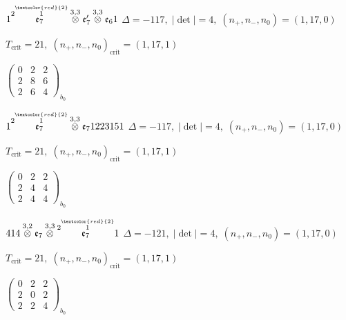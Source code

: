 \documentclass[10pt]{article}
\begin{document}
\smallskip

$1\overset{2\overset{\textcolor{red}{2}}{1}}{\mathfrak{e}_7}\overset{3,3}{\otimes}\mathfrak{e}_7'\overset{3,3}{\otimes}\mathfrak{e}_61$ \quad $\Delta=-117,\; |\det|=4,\; (n_+,n_-,n_0)=(1,17,0)$

\hspace{1em}$T_{\text{crit}}=21,\; (n_+,n_-,n_0)_{\text{crit}}=(1,17,1)$

\hspace{2em}$\left(\begin{smallmatrix}0 & 2 & 2 \\ 2 & 8 & 6 \\ 2 & 6 & 4\end{smallmatrix}\right)_{\!b_0}$

\smallskip

$1\overset{2\overset{\textcolor{red}{2}}{1}}{\mathfrak{e}_7}\overset{3,3}{\otimes}\mathfrak{e}_71223151$ \quad $\Delta=-117,\; |\det|=4,\; (n_+,n_-,n_0)=(1,17,0)$

\hspace{1em}$T_{\text{crit}}=21,\; (n_+,n_-,n_0)_{\text{crit}}=(1,17,1)$

\hspace{2em}$\left(\begin{smallmatrix}0 & 2 & 2 \\ 2 & 4 & 4 \\ 2 & 4 & 4\end{smallmatrix}\right)_{\!b_0}$

\smallskip

$414\overset{3,2}{\otimes}\mathfrak{e}_7\overset{3,3}{\otimes}\overset{2\overset{\textcolor{red}{2}}{1}}{\mathfrak{e}_7}1$ \quad $\Delta=-121,\; |\det|=4,\; (n_+,n_-,n_0)=(1,17,0)$

\hspace{1em}$T_{\text{crit}}=21,\; (n_+,n_-,n_0)_{\text{crit}}=(1,17,1)$

\hspace{2em}$\left(\begin{smallmatrix}0 & 2 & 2 \\ 2 & 0 & 2 \\ 2 & 2 & 4\end{smallmatrix}\right)_{\!b_0}$
\end{document}
